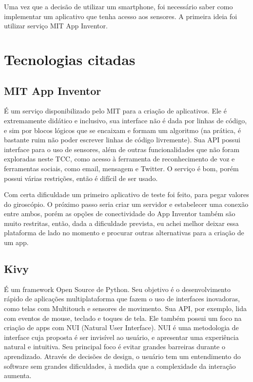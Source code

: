 \documentclass[a4paper,12pt]{article}
\begin{document}
Uma vez que a decisão de utilizar um smartphone, foi necessário saber como implementar um aplicativo que tenha acesso aos sensores.
A primeira ideia foi utilizar serviço MIT App Inventor.





\section{Tecnologias citadas}





\subsection{MIT App Inventor}

É um serviço disponibilizado pelo MIT para a criação de aplicativos. Ele é extremamente didático e inclusivo, sua interface não é dada por linhas de código, e sim por blocos lógicos que se encaixam e formam um algoritmo (na prática, é bastante ruim não poder escrever linhas de código livremente). Sua API possui interface para o uso de sensores, além de outras funcionalidades que não foram exploradas neste TCC, como acesso à ferramenta de reconhecimento de voz e ferramentas sociais, como email, mensagem e Twitter. O serviço é bom, porém possui várias restrições, então é difícil de ser usado.


Com certa dificuldade um primeiro aplicativo de teste foi feito, para pegar valores do giroscópio. O próximo passo seria criar um servidor e estabelecer uma conexão entre ambos, porém as opções de conectividade do App Inventor também são muito restritas, então, dada a dificuldade prevista, eu achei melhor deixar essa plataforma de lado no momento e procurar outras alternativas para a criação de um app.


\subsection{Kivy}

É um framework Open Source de Python. Seu objetivo é o desenvolvimento rápido de aplicações multiplataforma que fazem o uso de interfaces inovadoras, como telas com Multitouch e sensores de movimento. Sua API, por exemplo, lida com eventos de mouse, teclado e toques de tela. Ele também possui um foco na criação de apps com NUI (Natural User Interface).
  NUI é uma metodologia de interface cuja proposta é ser invisível ao usuário, e apresentar uma experiência natural e intuitiva. Seu principal foco é evitar grandes barreiras durante o aprendizado. Através de decisões de design, o usuário tem um entendimento do software sem grandes dificuldades, à medida que a complexidade da interação aumenta.
\end{document}
